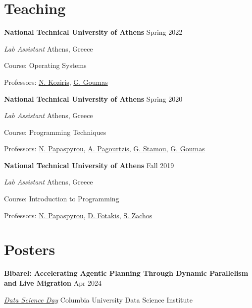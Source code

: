 \documentclass[margin,12pt]{resume}
\newcommand{\subsectionVSpace}{\vspace{3.5ex}\xspace}
\newcommand{\sectionVSpace}{\vspace{1ex}\xspace} %
\newcommand{\sectionVSpaceCorrection}{\vspace{-3.5ex}} %
\newcommand{\header}[1]{\textbf{#1}\xspace}
\newcommand{\event}[1]{\textit{#1}\xspace}
\newcommand{\institution}[1]{\header{#1}\xspace}
\newcommand{\place}[1]{#1\xspace}
\newcommand{\poster}[1]{\header{#1}\xspace}
\newcommand{\role}[1]{\textit{#1}\xspace}
\newcommand{\singleDate}[1]{#1\xspace}
\newcommand{\stitle}[1]{#1:\xspace}
\newenvironment{rSubsection}{}{\par\subsectionVSpace}
\newenvironment{rSection}[1]{\sectionVSpaceCorrection\section{#1}\xspace}{\sectionVSpace\par}
\begin{document}
\begin{resume}
\begin{rSection}{Teaching}
        \begin{rSubsection}
            \institution{National Technical University of Athens} \hfill \singleDate{Spring 2022}

            \role{Lab Assistant} \hfill \place{Athens, Greece}

            \stitle{Course} Operating Systems

            \stitle{Professors} \href{http://www.cslab.ntua.gr/~nkoziris/}{N. Koziris}, \href{http://www.cslab.ntua.gr/~goumas/}{G. Goumas}
        \end{rSubsection}

        \begin{rSubsection}
            \institution{National Technical University of Athens} \hfill \singleDate{Spring 2020}

            \role{Lab Assistant} \hfill \place{Athens, Greece}

            \stitle{Course} Programming Techniques

            \stitle{Professors} \href{http://www.softlab.ntua.gr/~nickie/}{N. Papaspyrou}, \href{http://users.softlab.ntua.gr/~pagour/}{A. Pagourtzis}, \href{http://www.image.ntua.gr/~gstam/}{G. Stamou}, \href{http://www.cslab.ntua.gr/~goumas/}{G. Goumas}
        \end{rSubsection}

        \begin{rSubsection}
            \institution{National Technical University of Athens} \hfill \singleDate{Fall 2019}

            \role{Lab Assistant} \hfill \place{Athens, Greece}

            \stitle{Course} Introduction to Programming

            \stitle{Professors} \href{http://www.softlab.ntua.gr/~nickie/}{N. Papaspyrou}, \href{http://www.softlab.ntua.gr/~fotakis/}{D. Fotakis}, \href{https://en.wikipedia.org/wiki/Stathis_Zachos}{S. Zachos}
        \end{rSubsection}
    \end{rSection}

    \begin{rSection}{Posters}
        \begin{rSubsection}
            \poster{Bibarel: Accelerating Agentic Planning Through Dynamic Parallelism and Live Migration} \hfill Apr 2024

            \event{\href{https://datascience.columbia.edu/event/data-science-day-2025/}{Data Science Day}} \hfill \place{Columbia University Data Science Institute}
        \end{rSubsection}


\end{rSection}
\end{resume}
\end{document}
